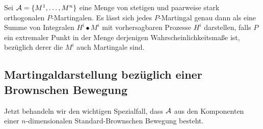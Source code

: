\begin{prop*}[Quintessenz]
Sei $\AA=\setd{M^1,\ldots,M^n}$ eine Menge von stetigen und paarweise
stark orthogonalen $P$-Martingalen. Es lässt sich jedes $P$-Martingal
genau dann als eine Summe von Integralen $H^i\bullet M^i$ mit vorhersagbaren
Prozesse $H^i$ darstellen, falls $P$ ein extremaler Punkt in der Menge
derjenigen Wahrscheinlichkeitsmaße ist, bezüglich derer die $M^i$ auch
Martingale sind.\fish
\end{prop*}

\subsection{Martingaldarstellung bezüglich einer Brownschen Bewegung}

Jetzt behandeln wir den wichtigen Spezialfall, dass $\AA$ aus den Komponenten
einer $n$-dimensionalen Standard-Brownschen Bewegung besteht.


